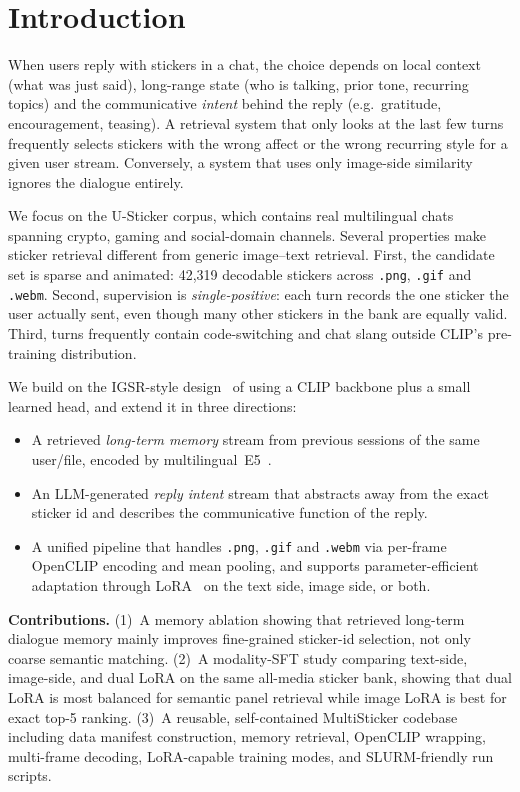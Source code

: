 \documentclass[10pt,twocolumn,letterpaper]{article}
\begin{document}
\section{Introduction}

When users reply with stickers in a chat, the choice depends on local
context (what was just said), long-range state (who is talking, prior tone,
recurring topics) and the communicative \emph{intent} behind the reply
(e.g.\ gratitude, encouragement, teasing). A retrieval system that only looks
at the last few turns frequently selects stickers with the wrong affect or the
wrong recurring style for a given user stream. Conversely, a system that uses
only image-side similarity ignores the dialogue entirely.

We focus on the U-Sticker corpus, which contains real multilingual chats
spanning crypto, gaming and social-domain channels. Several properties make
sticker retrieval different from generic image--text retrieval. First, the
candidate set is sparse and animated: 42{,}319 decodable stickers across
\texttt{.png}, \texttt{.gif} and \texttt{.webm}. Second, supervision is
\emph{single-positive}: each turn records the one sticker the user actually
sent, even though many other stickers in the bank are equally valid. Third,
turns frequently contain code-switching and chat slang outside CLIP's
pre-training distribution.

We build on the IGSR-style design~\cite{showandtell} of using a CLIP backbone
plus a small learned head, and extend it in three directions:
\begin{itemize}
\item A retrieved \emph{long-term memory} stream from previous sessions of the
      same user/file, encoded by multilingual~E5~\cite{wang2022e5}.
\item An LLM-generated \emph{reply intent} stream that abstracts away from the
      exact sticker id and describes the communicative function of the reply.
\item A unified pipeline that handles \texttt{.png}, \texttt{.gif} and
      \texttt{.webm} via per-frame OpenCLIP encoding and mean pooling, and
      supports parameter-efficient adaptation through LoRA~\cite{hu2021lora}
      on the text side, image side, or both.
\end{itemize}

\noindent\textbf{Contributions.}
(1)~A memory ablation showing that retrieved long-term dialogue memory mainly
improves fine-grained sticker-id selection, not only coarse semantic matching.
(2)~A modality-SFT study comparing text-side, image-side, and dual LoRA on the
same all-media sticker bank, showing that dual LoRA is most balanced for
semantic panel retrieval while image LoRA is best for exact top-5 ranking.
(3)~A reusable, self-contained MultiSticker codebase including data manifest
construction, memory retrieval, OpenCLIP wrapping, multi-frame decoding,
LoRA-capable training modes, and SLURM-friendly run scripts.
\end{document}

